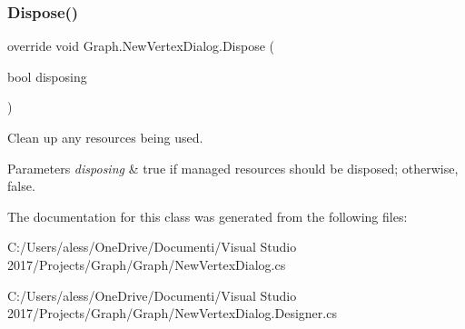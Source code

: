 \subsubsection{\texorpdfstring{Dispose()}{Dispose()}}
{\footnotesize\ttfamily override void Graph.\+New\+Vertex\+Dialog.\+Dispose (\begin{DoxyParamCaption}\item[{bool}]{disposing }\end{DoxyParamCaption})\hspace{0.3cm}{\ttfamily [protected]}}



Clean up any resources being used. 


\begin{DoxyParams}{Parameters}
{\em disposing} & true if managed resources should be disposed; otherwise, false.\\
\hline
\end{DoxyParams}


The documentation for this class was generated from the following files\+:\begin{DoxyCompactItemize}
\item 
C\+:/\+Users/aless/\+One\+Drive/\+Documenti/\+Visual Studio 2017/\+Projects/\+Graph/\+Graph/New\+Vertex\+Dialog.\+cs\item 
C\+:/\+Users/aless/\+One\+Drive/\+Documenti/\+Visual Studio 2017/\+Projects/\+Graph/\+Graph/New\+Vertex\+Dialog.\+Designer.\+cs\end{DoxyCompactItemize}
